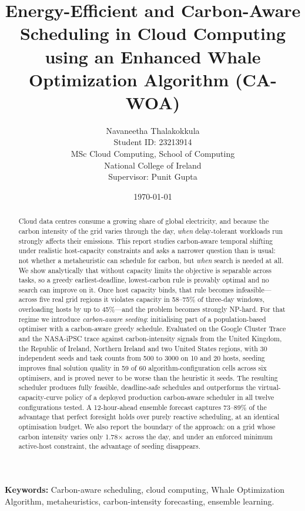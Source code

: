 \documentclass[12pt,a4paper]{article}
\title{\textbf{Energy-Efficient and Carbon-Aware Scheduling in Cloud Computing\\using an Enhanced Whale Optimization Algorithm (CA-WOA)}}
\author{Navaneetha Thalakokkula\\Student ID: 23213914\\MSc Cloud Computing, School of Computing\\National College of Ireland\\Supervisor: Punit Gupta}
\date{\today}
\begin{document}
\maketitle

\begin{abstract}
Cloud data centres consume a growing share of global electricity, and because the carbon intensity of the
grid varies through the day, \emph{when} delay-tolerant workloads run strongly affects their emissions. This
report studies carbon-aware temporal shifting under realistic host-capacity constraints and asks a narrower
question than is usual: not whether a metaheuristic can schedule for carbon, but \emph{when} search is needed
at all. We show analytically that without capacity limits the objective is separable across tasks, so a greedy
earliest-deadline, lowest-carbon rule is provably optimal and no search can improve on it. Once host capacity
binds, that rule becomes infeasible---across five real grid regions it violates capacity in 58--75\% of
three-day windows, overloading hosts by up to 45\%---and the problem becomes strongly NP-hard. For that regime
we introduce \emph{carbon-aware seeding}: initialising part of a population-based optimiser with a
carbon-aware greedy schedule. Evaluated on the Google Cluster Trace and the NASA-iPSC trace against
carbon-intensity signals from the United Kingdom, the Republic of Ireland, Northern Ireland and two United
States regions, with 30 independent seeds and task counts from 500 to 3000 on 10 and 20 hosts, seeding
improves final solution quality in 59 of 60 algorithm-configuration cells across six optimisers, and is proved
never to be worse than the heuristic it seeds. The resulting scheduler produces fully feasible, deadline-safe
schedules and outperforms the virtual-capacity-curve policy of a deployed production carbon-aware scheduler in
all twelve configurations tested. A 12-hour-ahead ensemble forecast captures 73--89\% of the advantage that perfect
foresight holds over purely reactive scheduling, at an identical optimisation budget. We also report the boundary of the
approach: on a grid whose carbon intensity varies only 1.78$\times$ across the day, and under an enforced
minimum active-host constraint, the advantage of seeding disappears.
\end{abstract}
\noindent\textbf{Keywords:} Carbon-aware scheduling, cloud computing, Whale Optimization Algorithm, metaheuristics, carbon-intensity forecasting, ensemble learning.
\end{document}
